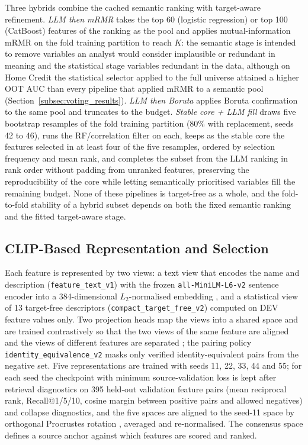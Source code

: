 \documentclass[final,5p,twocolumn]{elsarticle}
\newcommand{\Kfeat}{K}
\begin{document}
Three hybrids combine the cached semantic ranking with target-aware refinement. \emph{LLM then mRMR} takes the top 60 (logistic regression) or top 100 (CatBoost) features of the ranking as the pool and applies mutual-information mRMR on the fold training partition to reach $\Kfeat$: the semantic stage is intended to remove variables an analyst would consider implausible or redundant in meaning and the statistical stage variables redundant in the data, although on Home Credit the statistical selector applied to the full universe attained a higher OOT AUC than every pipeline that applied mRMR to a semantic pool (Section~\ref{subsec:voting_results}). \emph{LLM then Boruta} applies Boruta confirmation to the same pool and truncates to the budget. \emph{Stable core + LLM fill} draws five bootstrap resamples of the fold training partition (80\% with replacement, seeds 42 to 46), runs the RF/correlation filter on each, keeps as the stable core the features selected in at least four of the five resamples, ordered by selection frequency and mean rank, and completes the subset from the LLM ranking in rank order without padding from unranked features, preserving the reproducibility of the core while letting semantically prioritised variables fill the remaining budget. None of these pipelines is target-free as a whole, and the fold-to-fold stability of a hybrid subset depends on both the fixed semantic ranking and the fitted target-aware stage.

\subsection{CLIP-Based Representation and Selection}
\label{subsec:clip_fs}

\begin{sloppypar}
Each feature is represented by two views: a text view that encodes the name and description (\texttt{feature\_\allowbreak text\_\allowbreak v1}) with the frozen \texttt{all-\allowbreak MiniLM-\allowbreak L6-\allowbreak v2} sentence encoder into a 384-dimensional $L_2$-normalised embedding \cite{wang2020minilm,reimers2019}, and a statistical view of 13 target-free descriptors (\texttt{compact\_\allowbreak target\_\allowbreak free\_\allowbreak v2}) computed on DEV feature values only. Two projection heads map the views into a shared space and are trained contrastively so that the two views of the same feature are aligned and the views of different features are separated \cite{radford2021,oord2018}; the pairing policy \texttt{identity\_\allowbreak equivalence\_\allowbreak v2} masks only verified identity-equivalent pairs from the negative set. Five representations are trained with seeds 11, 22, 33, 44 and 55; for each seed the checkpoint with minimum source-validation loss is kept after retrieval diagnostics on 395 held-out validation feature pairs (mean reciprocal rank, Recall@1/5/10, cosine margin between positive pairs and allowed negatives) and collapse diagnostics, and the five spaces are aligned to the seed-11 space by orthogonal Procrustes rotation \cite{schonemann1966}, averaged and re-normalised. The consensus space defines a source anchor against which features are scored and ranked.
\end{sloppypar}
\end{document}
